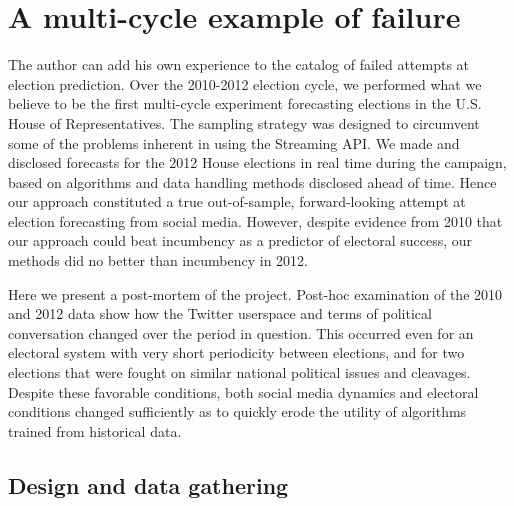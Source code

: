 \documentclass{article}
\begin{document}
\section{A multi-cycle example of failure}
\label{sec:multi-cycle-example}


The author can add his own experience to the catalog of failed
attempts at election prediction. Over the 2010-2012 election cycle, we
performed what we believe to be the first multi-cycle experiment
forecasting elections in the U.S. House of Representatives. The
sampling strategy was designed to circumvent some of the problems
inherent in using the Streaming API. We made and disclosed forecasts
for the 2012 House elections in real time during the campaign, based
on algorithms and data handling methods disclosed ahead of time. Hence
our approach constituted a true out-of-sample, forward-looking attempt
at election forecasting from social media. However, despite evidence
from 2010 that our approach could beat incumbency as a predictor of
electoral success, our methods did no better than incumbency in 2012.

Here we present a post-mortem of the project. Post-hoc examination of
the 2010 and 2012 data show how the Twitter userspace and terms of
political conversation changed over the period in question. This
occurred even for an electoral system with very short periodicity
between elections, and for two elections that were fought on similar
national political issues and cleavages. Despite these favorable
conditions, both social media dynamics and electoral conditions
changed sufficiently as to quickly erode the utility of algorithms
trained from historical data. 

\subsection{Design and data gathering}
\label{sec:design-data-gath}
\end{document}
